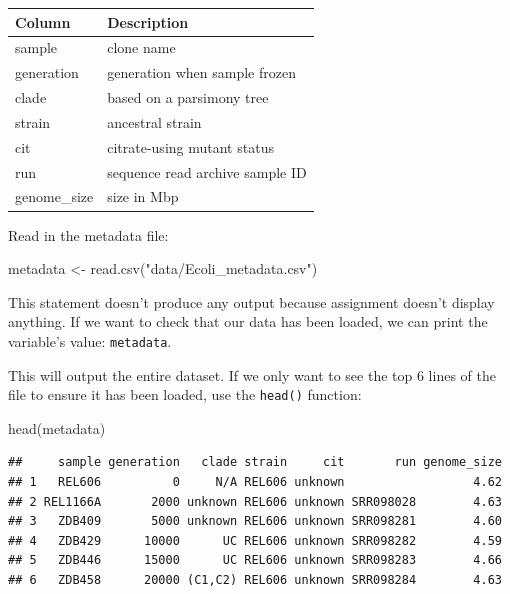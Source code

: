\documentclass[
]{book}
\newenvironment{Shaded}{\begin{snugshade}}{\end{snugshade}}
\newcommand{\FunctionTok}[1]{\textcolor[rgb]{0.00,0.00,0.00}{#1}}
\newcommand{\NormalTok}[1]{#1}
\newcommand{\OtherTok}[1]{\textcolor[rgb]{0.56,0.35,0.01}{#1}}
\newcommand{\StringTok}[1]{\textcolor[rgb]{0.31,0.60,0.02}{#1}}
\begin{document}
\begin{longtable}[]{@{}ll@{}}
\toprule
Column & Description \\
\midrule
\endhead
sample & clone name \\
generation & generation when sample frozen \\
clade & based on a parsimony tree \\
strain & ancestral strain \\
cit & citrate-using mutant status \\
run & sequence read archive sample ID \\
genome\_size & size in Mbp \\
\bottomrule
\end{longtable}

Read in the metadata file:

\begin{Shaded}
\begin{Highlighting}[]
\NormalTok{metadata }\OtherTok{\textless{}{-}} \FunctionTok{read.csv}\NormalTok{(}\StringTok{"data/Ecoli\_metadata.csv"}\NormalTok{)}
\end{Highlighting}
\end{Shaded}

This statement doesn't produce any output because assignment doesn't display anything. If we want to check that our data has been loaded, we can print the variable's value: \texttt{metadata}.

This will output the entire dataset. If we only want to see the top 6 lines of the file to ensure it has been loaded, use the \texttt{head()} function:

\begin{Shaded}
\begin{Highlighting}[]
\FunctionTok{head}\NormalTok{(metadata)}
\end{Highlighting}
\end{Shaded}

\begin{verbatim}
##     sample generation   clade strain     cit       run genome_size
## 1   REL606          0     N/A REL606 unknown                  4.62
## 2 REL1166A       2000 unknown REL606 unknown SRR098028        4.63
## 3   ZDB409       5000 unknown REL606 unknown SRR098281        4.60
## 4   ZDB429      10000      UC REL606 unknown SRR098282        4.59
## 5   ZDB446      15000      UC REL606 unknown SRR098283        4.66
## 6   ZDB458      20000 (C1,C2) REL606 unknown SRR098284        4.63
\end{verbatim}
\end{document}
